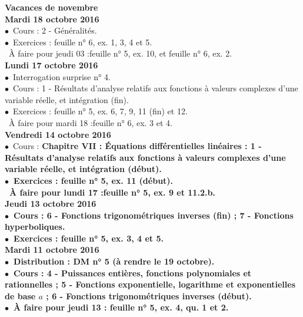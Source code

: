 \documentclass[12pt,a4paper]{article}
\begin{document}
\noindent\textbf{ Vacances de novembre }\vspace{.4cm}\\

\noindent\textbf{\bf Mardi 18 octobre 2016 }\\
$\bullet$\ Cours : 2 - Généralités.\\
$\bullet$\ Exercices : feuille n° 6, ex. 1, 3, 4 et 5.\\
\bu\ À faire pour jeudi 03 :feuille n° 5, ex. 10, et feuille n° 6, ex. 2.\vspace{.4cm}\\

\noindent\textbf{Lundi 17 octobre 2016 }\\
$\bullet$\ Interrogation surprise n° 4.\\
$\bullet$\ Cours : 1 - Résultats d'analyse relatifs aux fonctions à valeurs complexes d'une variable réelle, et 
intégration (fin).\\
$\bullet$\ Exercices : feuille n° 5, ex. 6, 7, 9, 11 (fin) et 12.\\
\bu\ À faire pour mardi 18 :feuille n° 6, ex. 3 et 4.\vspace{.4cm}\\
   
\noindent\textbf{Vendredi 14 octobre 2016 }\\
$\bullet$\ Cours : \bf Chapitre VII \rm : Équations différentielles linéaires : 1 - Résultats d'analyse relatifs aux 
fonctions à valeurs complexes d'une variable réelle, et intégration (début).\\
$\bullet$\ Exercices : feuille n° 5, ex. 11 (début).\\
\bu\ À faire pour lundi 17 :feuille n° 5, ex. 9 et 11.2.b.\vspace{.4cm}\\

\noindent\textbf{Jeudi 13 octobre 2016 }\\
$\bullet$\ Cours :  6 - Fonctions trigonométriques inverses (fin) ; 7 - Fonctions hyperboliques.\\
$\bullet$\ Exercices : feuille n° 5, ex. 3, 4 et 5.\vspace{.4cm}\\

\noindent\textbf{\bf Mardi 11 octobre 2016 }\\
$\bullet$\ Distribution : DM n° 5 (à rendre le 19 octobre).\\
$\bullet$\ Cours : 4 - Puissances entières, fonctions 
polynomiales et rationnelles ; 5 - Fonctions exponentielle, logarithme et 
exponentielles de base $a$ ; 6 - Fonctions trigonométriques inverses (début).\\
$\bullet$\ À faire pour jeudi 13 : feuille n° 5, ex. 4, qu. 1 et 2.\vspace{.4cm}\\
\end{document}
